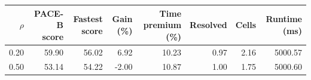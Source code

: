 \begin{tabular}{rrrrrrrr}
\toprule
$\rho$ & PACE-B score & Fastest score & Gain (\%) & Time premium (\%) & Resolved & Cells & Runtime (ms) \\
\midrule
0.20 & 59.90 & 56.02 & 6.92 & 10.23 & 0.97 & 2.16 & 5000.57 \\
0.50 & 53.14 & 54.22 & -2.00 & 10.87 & 1.00 & 1.75 & 5000.60 \\
\bottomrule
\end{tabular}
